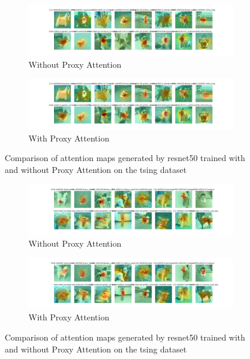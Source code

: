     \begin{figure}[H]
        \centering
        \begin{subfigure}[b]{1\textwidth}
            \includegraphics[width=\textwidth]{images/gpp_tsing_resnet50_noproxy_2.pdf}
            \caption{Without Proxy Attention}
        \end{subfigure}
        \hfill
        \begin{subfigure}[b]{1\textwidth}
            \includegraphics[width=\textwidth]{images/gpp_tsing_resnet50_proxy_2.pdf}
            \caption{With Proxy Attention}
        \end{subfigure}
        \caption{Comparison of attention maps generated by resnet50 trained with and without Proxy Attention on the tsing dataset}
    \end{figure}
    

    \begin{figure}[H]
        \centering
        \begin{subfigure}[b]{1\textwidth}
            \includegraphics[width=\textwidth]{images/gpp_tsing_resnet50_noproxy_3.pdf}
            \caption{Without Proxy Attention}
        \end{subfigure}
        \hfill
        \begin{subfigure}[b]{1\textwidth}
            \includegraphics[width=\textwidth]{images/gpp_tsing_resnet50_proxy_3.pdf}
            \caption{With Proxy Attention}
        \end{subfigure}
        \caption{Comparison of attention maps generated by resnet50 trained with and without Proxy Attention on the tsing dataset}
    \end{figure}
    
